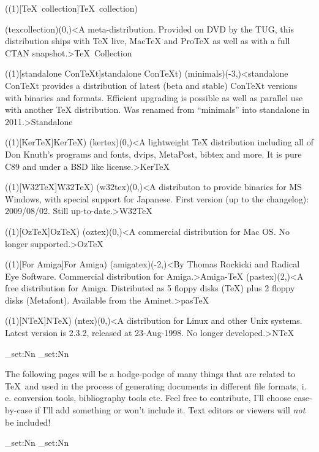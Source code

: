 \tograph(\tostruct(1)[\TeX\ collection]{\TeX\ collection}){
	\tonode(texcollection)(0,\layer)<A meta-distribution. Provided on DVD by the TUG, this distribution ships with TeX live, MacTeX and ProTeX as well as with a full CTAN snapshot.>{\TeX\ Collection}

}

\tograph(\tostruct(1)[standalone Con\TeX t]{standalone Con\TeX t}){
	\tonode(minimals)(-3,\layer)<standalone ConTeXt provides a distribution of latest (beta and stable) ConTeXt versions with binaries and formats. Efficient upgrading is possible as well as parallel use with another TeX distribution. Was renamed from “minimals” into standalone in 2011.>{Standalone}
}

\tograph(\tostruct(1)[Ker\TeX]{Ker\TeX}){
	\tonode(kertex)(0,\layer)<A lightweight TeX distribution including all of Don Knuth's programs and fonts, dvips, MetaPost, bibtex and more. It is pure C89 and under a BSD like license.>{Ker\TeX}
}

\tograph(\tostruct(1)[W32\TeX]{W32\TeX}){
	\tonode(w32tex)(0,\layer)<A distributon to provide binaries for MS Windows, with special support for Japanese. First version (up to the changelog): 2009/08/02. Still up-to-date.>{W32\TeX}
}

\tograph(\tostruct(1)[OzTeX]{OzTeX}){
	\tonode[\histdistro](oztex)(0,\layer)<A commercial distribution for Mac OS. No longer supported.>{Oz\TeX}
}

\tograph(\tostruct(1)[For Amiga]{For Amiga}){
	\tonode[\histdistro](amigatex)(-2,\layer)<By Thomas Rockicki and Radical Eye Software. Commercial distribution for Amiga.>{Amiga-TeX}
	\tonode[\histdistro](pastex)(2,\layer)<A free distribution for Amiga. Distributed as 5 floppy disks (TeX) plus 2 floppy disks (Metafont). Available from the Aminet.>{pasTeX}
}

\tograph(\tostruct(1)[N\TeX]{N\TeX}){
	\tonode[\histdistro](ntex)(0,\layer)<A distribution for Linux and other Unix systems. Latest version is 2.3.2, released at 23-Aug-1998. No longer developed.>{N\TeX}
}

\newpage
\ExplSyntaxOn
  \dim_set:Nn\pdfpagewidth{13cm}       %
  \dim_set:Nn\pdfpageheight{6cm}
\ExplSyntaxOff
\newpage
{}
\parbox{\textwidth}{\normalsize
The following pages will be a hodge-podge of many things that are related to \TeX\ and used in the process of generating documents in different file formats, i.\,e. conversion tools, bibliography tools etc. Feel free to contribute, I'll choose case-by-case if I'll add something or won't include it. Text editors or viewers will \emph{not} be included!
}
  \restoregeometry
\ExplSyntaxOn
  \dim_set:Nn\pdfpagewidth{21cm}     %
  \dim_set:Nn\pdfpageheight{29.7cm}
\ExplSyntaxOff

